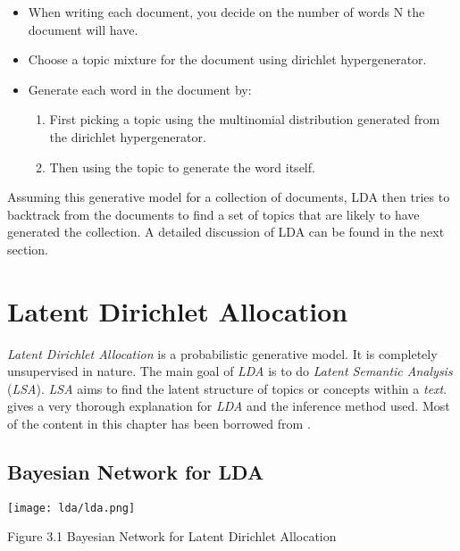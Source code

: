 \begin{itemize}

\item When writing each document, you decide on the number of words N the document will have.

\item Choose a topic mixture for the document using dirichlet hypergenerator.

\item Generate each word in the document by:
  
  \begin{enumerate}
  
  \item First picking a topic using the multinomial distribution generated from the dirichlet hypergenerator.
  
  \item Then using the topic to generate the word itself.

  \end{enumerate}

\end{itemize}

Assuming this generative model for a collection of documents, LDA then tries to backtrack from the documents to find a set of 
topics that are likely to have generated the collection. A detailed discussion of LDA can be found in the next section.

\section{Latent Dirichlet Allocation}

\par

\textit{Latent Dirichlet Allocation} is a probabilistic generative model. It is completely unsupervised in nature. The main goal of 
\textit{LDA} is to do \textit{Latent Semantic Analysis} (\textit{LSA}). \textit{LSA} aims to find the latent structure of topics or 
concepts within a \textit{text}. \citep*{heinrich2005parameter} gives a very thorough explanation for \textit{LDA} and the inference 
method used. Most of the content in this chapter has been borrowed from \citep*{heinrich2005parameter}.

\subsection{Bayesian Network for LDA}

\texttt{[image: lda/lda.png]} 
\begin{center}
 Figure 3.1 Bayesian Network for Latent Dirichlet Allocation
\end{center}

